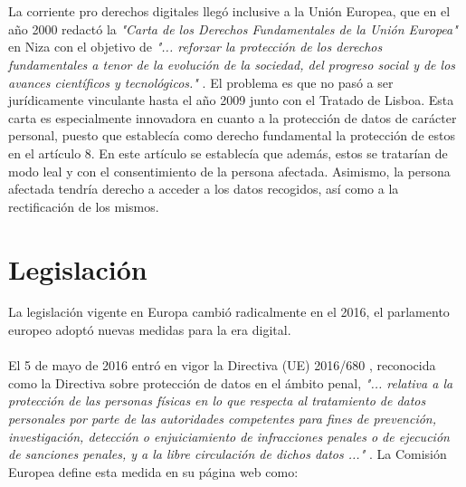 \begin{refsection}
\\ \\
La corriente pro derechos digitales llegó inclusive a la Unión Europea, que en el año 2000 redactó la \textit{"Carta de los Derechos Fundamentales de la Unión Europea"} \autocite{CartaDerechosFundamentalesb} en Niza con el objetivo de \textit{"... reforzar la protección de los derechos fundamentales a tenor de la evolución de la sociedad, del progreso social y de los avances científicos y tecnológicos."} \autocite[]{CartaDerechosFundamentalesb}. El problema es que no pasó a ser jurídicamente vinculante hasta el año 2009 junto con el Tratado de Lisboa. Esta carta es especialmente innovadora en cuanto a la protección de datos de carácter personal, puesto que establecía como derecho fundamental la protección de estos en el artículo 8. En este artículo se establecía que además, estos se tratarían de modo leal y con el consentimiento de la persona afectada. Asimismo, la persona afectada tendría derecho a acceder a los datos recogidos, así como a la rectificación de los mismos.

\section{Legislación}\label{appendix:ProteccionDatos_Legislacion}
La legislación vigente en Europa cambió radicalmente en el 2016, el parlamento europeo adoptó nuevas medidas para la era digital.
\\ \\
El 5 de mayo de 2016 entró en vigor la Directiva (UE) 2016/680 \autocite{DIRECTIVAUE2016}, reconocida como la Directiva sobre protección de datos en el ámbito penal, \textit{"... relativa a la protección de las personas físicas en lo que respecta al tratamiento de datos personales por parte de las autoridades competentes para fines de prevención, investigación, detección o enjuiciamiento de infracciones penales o de ejecución de sanciones penales, y a la libre circulación de dichos datos ..."} \autocite[]{DIRECTIVAUE2016}. La Comisión Europea define esta medida en su página web \autocite{ProteccionDatosUEa} como:


\end{refsection}

